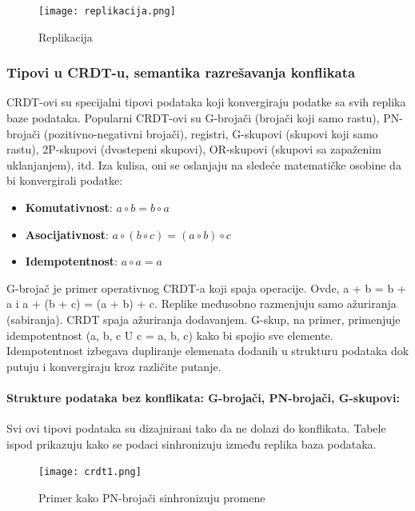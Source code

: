 \documentclass[12pt]{article}
\begin{document}
\begin{figure}[H]
	\centering
	\texttt{[image: replikacija.png]}
	\caption{Replikacija}
	
\end{figure}
    
\subsubsection{Tipovi u CRDT-u, semantika razrešavanja konflikata}

CRDT-ovi su specijalni tipovi podataka koji konvergiraju podatke sa svih replika baze podataka. Popularni CRDT-ovi su G-brojači (brojači koji samo rastu), PN-brojači (pozitivno-negativni brojači), registri, G-skupovi (skupovi koji samo rastu), 2P-skupovi (dvostepeni skupovi), OR-skupovi (skupovi sa zapaženim uklanjanjem), itd. Iza kulisa, oni se oslanjaju na sledeće matematičke osobine da bi konvergirali podatke:

\begin{itemize}
	\item \textbf{Komutativnost}: $a \circ b = b \circ a $
	\item \textbf{Asocijativnost}: $a \circ (b \circ c) = (a \circ b) \circ c $
	\item \textbf{Idempotentnost}: $a \circ a = a $
\end{itemize}
    
G-brojač je primer operativnog CRDT-a koji spaja operacije. Ovde, a + b = b + a i a + (b + c) = (a + b) + c. Replike međusobno razmenjuju samo ažuriranja (sabiranja). CRDT spaja ažuriranja dodavanjem. G-skup, na primer, primenjuje idempotentnost ({a, b, c} U {c} = {a, b, c}) kako bi spojio sve elemente. Idempotentnost izbegava dupliranje elemenata dodanih u strukturu podataka dok putuju i konvergiraju kroz različite putanje.

\paragraph{Strukture podataka bez konflikata: G-brojači, PN-brojači, G-skupovi:}

Svi ovi tipovi podataka su dizajnirani tako da ne dolazi do konflikata. Tabele ispod prikazuju kako se podaci sinhronizuju između replika baza podataka. 

\begin{figure}[H]
	\centering
	\texttt{[image: crdt1.png]}
	\caption{Primer kako PN-brojači sinhronizuju promene}
	
\end{figure}
\end{document}
